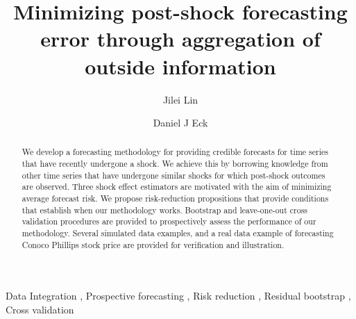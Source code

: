 \documentclass[11pt,3p,review,authoryear]{elsarticle}
\begin{document}
\begin{frontmatter}

\title{Minimizing post-shock forecasting error through aggregation of outside information}

  \author[uiuc]{Jilei Lin}

 \author[uiuc]{Daniel J Eck}
 \address[uiuc]{Department of Statistics, University of Illinois at Urbana-Champaign\\
 725 S. Wright St., Champaign, IL, 61820, U.S.}


\begin{abstract}
 We develop a forecasting methodology for providing credible forecasts for time series that have recently undergone a shock. We achieve this by borrowing knowledge from other time series that have undergone similar shocks for which post-shock outcomes are observed. Three shock effect estimators are motivated with the aim of minimizing average forecast risk. We propose risk-reduction propositions that provide conditions that establish when our methodology works. Bootstrap and leave-one-out cross validation procedures are provided to prospectively assess the performance of our methodology. Several simulated data examples, and a real data example of forecasting Conoco Phillips stock price are provided for verification and illustration.
\end{abstract}

\begin{keyword}
  Data Integration \sep 
 Prospective forecasting \sep 
 Risk reduction \sep 
Residual bootstrap \sep 
Cross validation 
\end{keyword}

\end{frontmatter}
\end{document}
